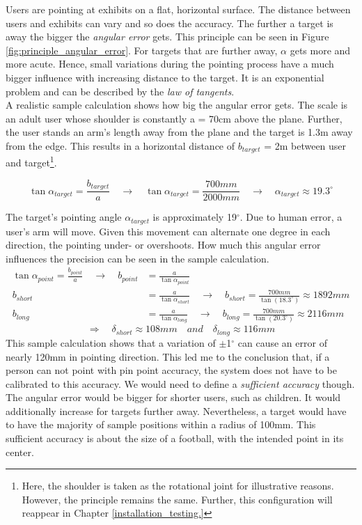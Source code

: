 Users are pointing at exhibits on a flat, horizontal surface. The distance between users and exhibits can vary and so does the accuracy. The further a target is away the bigger the \textit{angular error} gets. This principle can be seen in Figure \ref{fig:principle_angular_error}. For targets that are further away, $\alpha$ gets more and more acute. Hence, small variations during the pointing process have a much bigger influence with increasing distance to the target. It is an exponential problem and can be described by the \textit{law of tangents}. 
\\
A realistic sample calculation shows how big the angular error gets. The scale is an adult user whose shoulder is constantly a = 70cm above the plane. Further, the user stands an arm's length away from the plane and the target is 1.3m away from the edge. This results in a horizontal distance of $b_{target}$ = 2m between user and target\footnote{Here, the shoulder is taken as the rotational joint for illustrative reasons. However, the principle remains the same. Further, this configuration will reappear in Chapter \ref{installation_testing.}}.

$$\tan{\alpha_{target}} = \frac{b_{target}}{a} \quad \to \quad \tan{\alpha_{target}} = \frac{700mm}{2000mm} \quad \to \quad \alpha_{target} \approx 19.3^\circ$$

The target's pointing angle $\alpha_{target}$ is approximately 19$^\circ$. Due to human error, a user's arm will move. Given this movement can alternate one degree in each direction, the pointing under- or overshoots. How much this angular error influences the precision can be seen in the sample calculation.
\begin{align*}
	\tan{\alpha_{point}} = \frac{b_{point}}{a} \quad \to \quad b_{point} &= \frac{a}{\tan{\alpha_{point}}}
	\\
	b_{short} &= \frac{a}{\tan{\alpha_{short}}} \quad \to \quad b_{short} = \frac{700mm}{\tan{(18.3^\circ)}} \approx 1892mm
	\\
	b_{long} &= \frac{a}{\tan{\alpha_{long}}} \quad \to \quad b_{long} = \frac{700mm}{\tan{(20.3^\circ)}} \approx 2116mm
\end{align*}
$$\Rightarrow \quad \delta_{short} \approx 108mm \quad and \quad \delta_{long} \approx 116mm$$
This sample calculation shows that a variation of $\pm$1$^\circ$ can cause an error of nearly 120mm in pointing direction. This led me to the conclusion that, if a person can not point with pin point accuracy, the system does not have to be calibrated to this accuracy. We would need to define a \textit{sufficient accuracy} though. The angular error would be bigger for shorter users, such as children. It would additionally increase for targets further away. Nevertheless, a target would have to have the majority of sample positions within a radius of 100mm. This sufficient accuracy is about the size of a football, with the intended point in its center.


